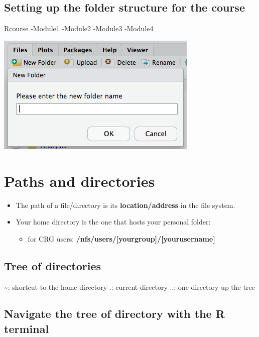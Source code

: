 \documentclass[]{book}
\providecommand{\tightlist}{%
  \setlength{\itemsep}{0pt}\setlength{\parskip}{0pt}}
\begin{document}
\hypertarget{setting-up-the-folder-structure-for-the-course}{%
\section{Setting up the folder structure for the course}\label{setting-up-the-folder-structure-for-the-course}}

Rcourse
\textbar{}-Module1
\textbar{}-Module2
\textbar{}-Module3
\textbar{}-Module4

\includegraphics{images/rstudio_folder.png}

\hypertarget{paths-and-directories}{%
\chapter{Paths and directories}\label{paths-and-directories}}

\begin{itemize}
\item
  The path of a file/directory is its \textbf{location/address} in the file system.
\item
  Your home directory is the one that hosts your personal folder:

  \begin{itemize}
  \tightlist
  \item
    for CRG users: \textbf{/nfs/users/{[}yourgroup{]}/{[}yourusername{]}}
  \end{itemize}
\end{itemize}

\hypertarget{tree-of-directories}{%
\section{Tree of directories}\label{tree-of-directories}}

 \textasciitilde{}: shortcut to the home directory
 .: current directory
 ..: one directory up the tree

\hypertarget{navigate-the-tree-of-directory-with-the-r-terminal}{%
\section{Navigate the tree of directory with the R terminal}\label{navigate-the-tree-of-directory-with-the-r-terminal}}
\end{document}
